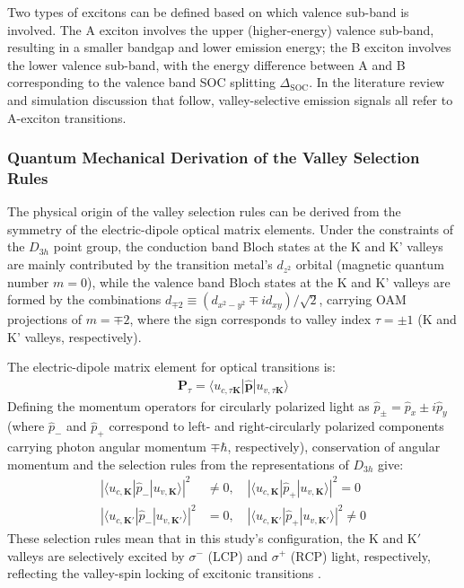Two types of excitons can be defined based on which valence sub-band is involved. The A exciton involves the upper (higher-energy) valence sub-band, resulting in a smaller bandgap and lower emission energy; the B exciton involves the lower valence sub-band, with the energy difference between A and B corresponding to the valence band SOC splitting $\Delta_{\text{SOC}}$. In the literature review and simulation discussion that follow, valley-selective emission signals all refer to A-exciton transitions.

\subsubsection*{Quantum Mechanical Derivation of the Valley Selection Rules}

The physical origin of the valley selection rules can be derived from the symmetry of the electric-dipole optical matrix elements. Under the constraints of the $D_{3h}$ point group, the conduction band Bloch states at the K and K' valleys are mainly contributed by the transition metal's $d_{z^2}$ orbital (magnetic quantum number $m = 0$), while the valence band Bloch states at the K and K' valleys are formed by the combinations $d_{\mp 2} \equiv (d_{x^2-y^2} \mp i d_{xy})/\sqrt{2}$, carrying OAM projections of $m = \mp 2$, where the sign corresponds to valley index $\tau = \pm 1$ (K and K' valleys, respectively).

The electric-dipole matrix element for optical transitions is:
\begin{align}
\mathbf{P}_\tau = \langle u_{c,\tau\mathbf{K}} | \hat{\mathbf{p}} | u_{v,\tau\mathbf{K}} \rangle
\end{align}
Defining the momentum operators for circularly polarized light as $\hat{p}_\pm = \hat{p}_x \pm i\hat{p}_y$ (where $\hat{p}_-$ and $\hat{p}_+$ correspond to left- and right-circularly polarized components carrying photon angular momentum $\mp\hbar$, respectively), conservation of angular momentum and the selection rules from the representations of $D_{3h}$ give:
\begin{align}
|\langle u_{c,\mathbf{K}} | \hat{p}_- | u_{v,\mathbf{K}} \rangle|^2 &\neq 0, \quad |\langle u_{c,\mathbf{K}} | \hat{p}_+ | u_{v,\mathbf{K}} \rangle|^2 = 0 \\ 
|\langle u_{c,\mathbf{K}'} | \hat{p}_- | u_{v,\mathbf{K}'} \rangle|^2 &= 0, \quad |\langle u_{c,\mathbf{K}'} | \hat{p}_+ | u_{v,\mathbf{K}'} \rangle|^2 \neq 0 
\end{align}
These selection rules mean that in this study's configuration, the $\text{K}$ and $\text{K}'$ valleys are selectively excited by $\sigma^-$ ($\text{LCP}$) and $\sigma^+$ ($\text{RCP}$) light, respectively, reflecting the valley-spin locking of excitonic transitions \cite{xiao2012coupled}.

